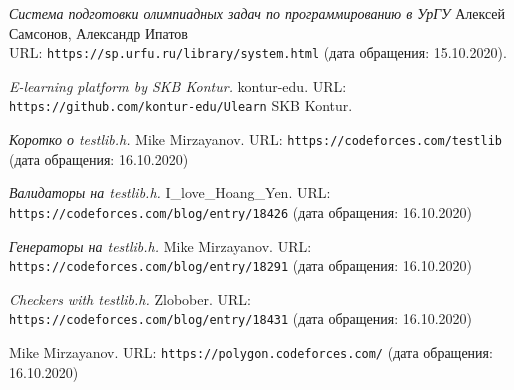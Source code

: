 %


% 

\begin{thebibliography}{9}

\bibitem{}
\textit{Система подготовки олимпиадных задач по программированию в УрГУ}
Алексей Самсонов, Александр Ипатов\\
URL: \texttt{https://sp.urfu.ru/library/system.html} (дата обращения: 15.10.2020).

\bibitem{}
\textit{E-learning platform by SKB Kontur.}
kontur-edu.
URL: \texttt{https://github.com/kontur-edu/Ulearn}
SKB Kontur. 

\bibitem{}
\textit{Коротко о testlib.h.}
Mike Mirzayanov.
URL: \texttt{https://codeforces.com/testlib} (дата обращения: 16.10.2020)

\bibitem{}
\textit{Валидаторы на testlib.h.}
 I\_love\_Hoang\_Yen.
URL: \texttt{https://codeforces.com/blog/entry/18426} (дата обращения: 16.10.2020)
 
 \bibitem{}
 \textit{Генераторы на testlib.h.}
 Mike Mirzayanov.
 URL: \texttt{https://codeforces.com/blog/entry/18291} (дата обращения: 16.10.2020)
 
 \bibitem{}
 \textit{Checkers with testlib.h.}
 Zlobober.
URL: \texttt{https://codeforces.com/blog/entry/18431} (дата обращения: 16.10.2020)
 
 \bibitem{}
Mike Mirzayanov.
URL: \texttt{https://polygon.codeforces.com/} (дата обращения: 16.10.2020)



\end{thebibliography}


